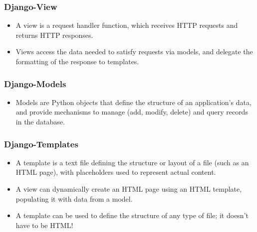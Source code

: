 \documentclass{beamer}
\begin{document}
\begin{frame}
\frametitle{Django-View}
\begin{itemize}
 \item A view is a request handler function, which receives HTTP requests and returns HTTP responses. 
 \item Views access the data needed to satisfy requests via models, and delegate the formatting of the response to templates.
   \end{itemize}
\end{frame}
\begin{frame}
\frametitle{Django-Models}
\begin{itemize}
 \item Models are Python objects that define the structure of an application's data, and provide mechanisms to manage (add, modify, delete) and query records in the database.
   \end{itemize}
\end{frame}
\begin{frame}
\frametitle{Django-Templates}
\begin{itemize}
 \item A template is a text file defining the structure or layout of a file (such as an HTML page), with placeholders used to represent actual content. 
 \item A view can dynamically create an HTML page using an HTML template, populating it with data from a model. 
 \item A template can be used to define the structure of any type of file; it doesn't have to be HTML!
   \end{itemize}
\end{frame}
\end{document}
